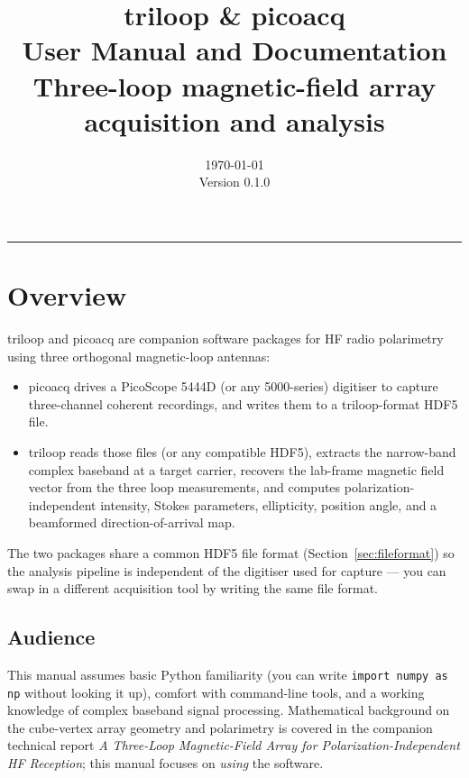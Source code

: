 \documentclass[11pt]{article}
\title{\Large\bfseries triloop \& picoacq\\[2pt]
       \large User Manual and Documentation\\[8pt]
       \normalsize Three-loop magnetic-field array acquisition and analysis}
\author{}
\date{\today \\[6pt] \small Version 0.1.0}
\begin{document}
\maketitle

\tableofcontents
\bigskip\hrule\bigskip

\section{Overview}

\textsf{triloop} and \textsf{picoacq} are companion software packages
for HF radio polarimetry using three orthogonal magnetic-loop antennas:

\begin{itemize}\itemsep=2pt
\item \textsf{picoacq} drives a PicoScope 5444D (or any 5000-series)
      digitiser to capture three-channel coherent recordings, and
      writes them to a triloop-format HDF5 file.
\item \textsf{triloop} reads those files (or any compatible HDF5),
      extracts the narrow-band complex baseband at a target carrier,
      recovers the lab-frame magnetic field vector from the three loop
      measurements, and computes polarization-independent intensity,
      Stokes parameters, ellipticity, position angle, and a beamformed
      direction-of-arrival map.
\end{itemize}

The two packages share a common HDF5 file format
(Section~\ref{sec:fileformat}) so the analysis pipeline is independent
of the digitiser used for capture --- you can swap in a different
acquisition tool by writing the same file format.

\subsection{Audience}

This manual assumes basic Python familiarity (you can write
\texttt{import numpy as np} without looking it up), comfort with
command-line tools, and a working knowledge of complex baseband signal
processing.  Mathematical background on the cube-vertex array geometry
and polarimetry is covered in the companion technical report
\textsl{A Three-Loop Magnetic-Field Array for Polarization-Independent
HF Reception}; this manual focuses on \emph{using} the software.
\end{document}
